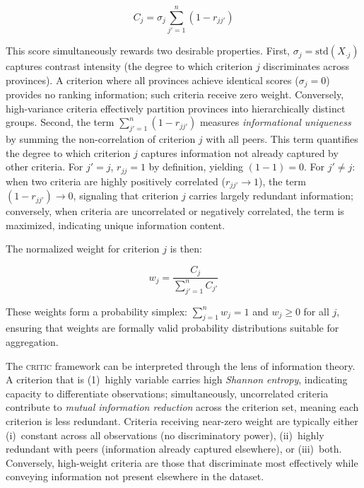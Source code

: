 \documentclass[12pt,a4paper]{article}
\newcommand{\CRITIC}{\textsc{critic}\xspace}
\begin{document}
\begin{equation}
\label{eq:critic_score}
C_j = \sigma_j \sum_{j'=1}^{n} (1 - r_{jj'})
\end{equation}

This score simultaneously rewards two desirable properties. First, $\sigma_j = \text{std}(X_{\cdot j})$ captures contrast intensity (the degree to which criterion $j$ discriminates across provinces). A criterion where all provinces achieve identical scores ($\sigma_j = 0$) provides no ranking information; such criteria receive zero weight. Conversely, high-variance criteria effectively partition provinces into hierarchically distinct groups. Second, the term $\sum_{j'=1}^{n} (1 - r_{jj'})$ measures \emph{informational uniqueness} by summing the non-correlation of criterion $j$ with all peers. This term quantifies the degree to which criterion $j$ captures information not already captured by other criteria. For $j' = j$, $r_{jj} = 1$ by definition, yielding $(1 - 1) = 0$. For $j' \neq j$: when two criteria are highly positively correlated ($r_{jj'} \to 1$), the term $(1 - r_{jj'}) \to 0$, signaling that criterion $j$ carries largely redundant information; conversely, when criteria are uncorrelated or negatively correlated, the term is maximized, indicating unique information content.

The normalized weight for criterion $j$ is then:

\begin{equation}
\label{eq:critic_weight}
w_j = \frac{C_j}{\sum_{j'=1}^{n} C_{j'}}
\end{equation}

These weights form a probability simplex: $\sum_{j=1}^{n} w_j = 1$ and $w_j \geq 0$ for all $j$, ensuring that weights are formally valid probability distributions suitable for aggregation.

The \CRITIC framework can be interpreted through the lens of information theory. A criterion that is (1)~highly variable carries high \emph{Shannon entropy}, indicating capacity to differentiate observations; simultaneously, uncorrelated criteria contribute to \emph{mutual information reduction} across the criterion set, meaning each criterion is less redundant. Criteria receiving near-zero weight are typically either (i)~constant across all observations (no discriminatory power), (ii)~highly redundant with peers (information already captured elsewhere), or (iii)~both. Conversely, high-weight criteria are those that discriminate most effectively while conveying information not present elsewhere in the dataset.
\end{document}
